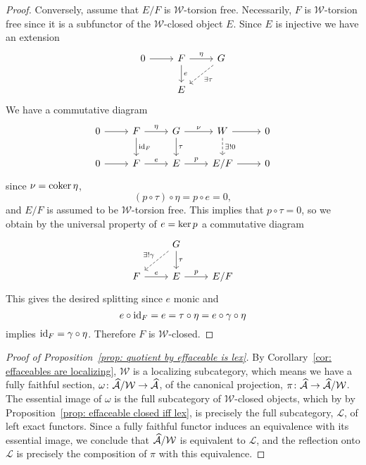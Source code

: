 \documentclass[reqno, 12pt]{amsart}
\begin{document}
\begin{proof}
  Conversely, assume that $E/F$ is $\mathcal{W}$-torsion free.
  Necessarily, $F$ is $\mathcal{W}$-torsion free since it is a subfunctor of the $\mathcal{W}$-closed object $E$.
  Since $E$ is injective we have an extension
  $$\begin{tikzcd}
    0 \arrow{r} & F \arrow{d}{e}\arrow{r}{\eta} & G\arrow[dashed]{ld}{\exists \tau}\\
    & E
  \end{tikzcd}$$
  We have a commutative diagram
  $$\begin{tikzcd}
    0 \arrow{r} & F \arrow{r}{\eta}\arrow{d}{\id_F} & G \arrow{r}{\nu}\arrow{d}{\tau} & W \arrow{r}\arrow[dashed]{d}{\exists !0} & 0\\
    0 \arrow{r} & F \arrow{r}{e} & E \arrow{r}{p} & E/F \arrow{r} & 0
  \end{tikzcd}$$
  since $\nu = \operatorname{coker} \eta$,
  $$(p \circ \tau) \circ \eta = p \circ e = 0,$$
  and $E/F$ is assumed to be $\mathcal{W}$-torsion free.
  This implies that $p \circ \tau = 0$, so we obtain by the universal property of $e = \operatorname{ker} p$ a commutative diagram
  $$\begin{tikzcd}
    & G \arrow[dashed,swap]{ld}{\exists !\gamma}\arrow{d}{\tau}\\
    F \arrow{r}{e} & E \arrow{r}{p} & E/F
  \end{tikzcd}$$
  This gives the desired splitting since $e$ monic and
  $$e \circ \operatorname{id}_F = e = \tau \circ \eta = e \circ \gamma \circ \eta$$
  implies $\operatorname{id}_F = \gamma \circ \eta$.
  Therefore $F$ is $\mathcal{W}$-closed.
  
\end{proof}

\begin{proof}[Proof of Proposition~\ref{prop: quotient by effaceable is lex}]
  By Corollary~\ref{cor: effaceables are localizing}, $\mathcal{W}$ is a localizing subcategory, which means we have a fully faithful section, $\omega \colon \widehat{\mathcal{A}}/\mathcal{W} \to \widehat{\mathcal{A}}$, of the canonical projection, $\pi \colon \widehat{\mathcal{A}} \to \widehat{\mathcal{A}}/\mathcal{W}$.
  The essential image of $\omega$ is the full subcategory of $\mathcal{W}$-closed objects, which by by Proposition~\ref{prop: effaceable closed iff lex}, is precisely the full subcategory, $\mathcal{L}$, of left exact functors.
  Since a fully faithful functor induces an equivalence with its essential image, we conclude that $\widehat{\mathcal{A}}/\mathcal{W}$ is equivalent to $\mathcal{L}$, and the reflection onto $\mathcal{L}$ is precisely the composition of $\pi$ with this equivalence.
\end{proof}
\end{document}
